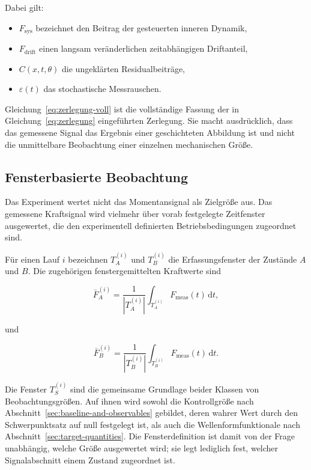 \documentclass[12pt,a4paper]{report}
\begin{document}
Dabei gilt:

\begin{itemize}
\item $F_{\mathrm{sys}}$ bezeichnet den Beitrag der gesteuerten inneren
      Dynamik,
\item $F_{\mathrm{drift}}$ einen langsam veränderlichen zeitabhängigen
      Driftanteil,
\item $C(x,t,\theta)$ die ungeklärten Residualbeiträge,
\item $\varepsilon(t)$ das stochastische Messrauschen.
\end{itemize}

Gleichung~\eqref{eq:zerlegung-voll} ist die vollständige Fassung der in
Gleichung~\eqref{eq:zerlegung} eingeführten Zerlegung. Sie macht
ausdrücklich, dass das gemessene Signal das Ergebnis einer geschichteten
Abbildung ist und nicht die unmittelbare Beobachtung einer einzelnen
mechanischen Größe.

\subsection{Fensterbasierte Beobachtung}

Das Experiment wertet nicht das Momentansignal als Zielgröße aus. Das
gemessene Kraftsignal wird vielmehr über vorab festgelegte Zeitfenster
ausgewertet, die den experimentell definierten Betriebsbedingungen
zugeordnet sind.

Für einen Lauf $i$ bezeichnen $T_A^{(i)}$ und $T_B^{(i)}$ die
Erfassungsfenster der Zustände $A$ und $B$. Die zugehörigen
fenstergemittelten Kraftwerte sind

\begin{equation}
\bar{F}_{A}^{(i)}
=
\frac{1}{|T_A^{(i)}|}
\int_{T_A^{(i)}} F_{\mathrm{meas}}(t)\,\mathrm{d}t,
\label{eq:fenster-a}
\end{equation}

und

\begin{equation}
\bar{F}_{B}^{(i)}
=
\frac{1}{|T_B^{(i)}|}
\int_{T_B^{(i)}} F_{\mathrm{meas}}(t)\,\mathrm{d}t.
\label{eq:fenster-b}
\end{equation}

Die Fenster $T_S^{(i)}$ sind die gemeinsame Grundlage beider Klassen von
Beobachtungsgrößen. Auf ihnen wird sowohl die Kontrollgröße nach
Abschnitt~\ref{sec:baseline-and-observables} gebildet, deren wahrer Wert
durch den Schwerpunktsatz auf null festgelegt ist, als auch die
Wellenformfunktionale nach
Abschnitt~\ref{sec:target-quantities}. Die Fensterdefinition ist damit
von der Frage unabhängig, welche Größe ausgewertet wird; sie legt
lediglich fest, welcher Signalabschnitt einem Zustand zugeordnet ist.
\end{document}
